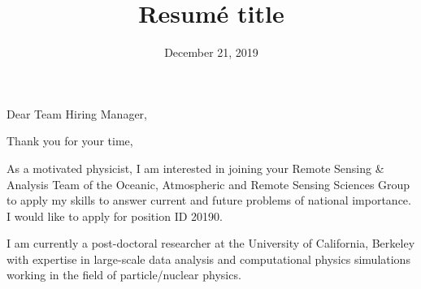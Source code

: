 \documentclass[11pt]{moderncv}        %
\title{Resumé title}                               %
\begin{document}
\date{December 21, 2019}
\opening{Dear Team Hiring Manager,}
\closing{Thank you for your time,}
\makelettertitle

\justifying
As a motivated physicist, I am interested in joining your Remote Sensing \&
Analysis Team of the Oceanic, Atmospheric and Remote Sensing Sciences Group to
apply my skills to answer current and future problems of national importance.
I would like to apply for position ID 20190.

I am currently a post-doctoral researcher at the University of California,
Berkeley with expertise in large-scale data analysis and computational physics
simulations working in the field of particle/nuclear physics.
\end{document}
